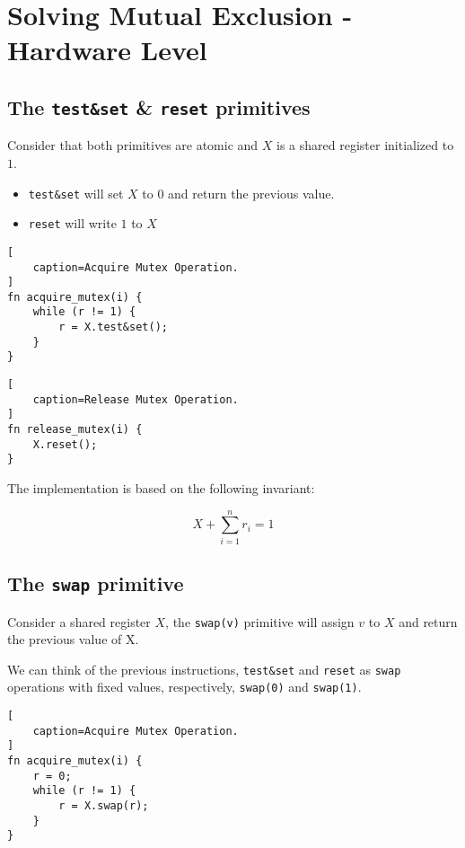 \section{Solving Mutual Exclusion - Hardware Level}

\subsection{The \texttt{test\&set} \& \texttt{reset} primitives}

Consider that both primitives are atomic and $X$ is a shared register initialized to $1$.
\begin{itemize}
    \item \texttt{test\&set} will set $X$ to $0$ and return the previous value.
    \item \texttt{reset} will write $1$ to $X$
\end{itemize}

\begin{lstlisting}[
    caption=Acquire Mutex Operation.
]
fn acquire_mutex(i) {
    while (r != 1) {
        r = X.test&set();
    }
}
\end{lstlisting}

\begin{lstlisting}[
    caption=Release Mutex Operation.
]
fn release_mutex(i) {
    X.reset();
}
\end{lstlisting}

The implementation is based on the following invariant:

\begin{equation*}
     X + \sum_{i=1}^{n} r_i = 1
\end{equation*}

\subsection{The \texttt{swap} primitive}

Consider a shared register $X$,
the \texttt{swap(v)} primitive will assign $v$ to $X$
and return the previous value of X.

We can think of the previous instructions,
\texttt{test\&set} and \texttt{reset} as \texttt{swap} operations with fixed values,
respectively, \texttt{swap(0)} and \texttt{swap(1)}.

\begin{lstlisting}[
    caption=Acquire Mutex Operation.
]
fn acquire_mutex(i) {
    r = 0;
    while (r != 1) {
        r = X.swap(r);
    }
}
\end{lstlisting}

